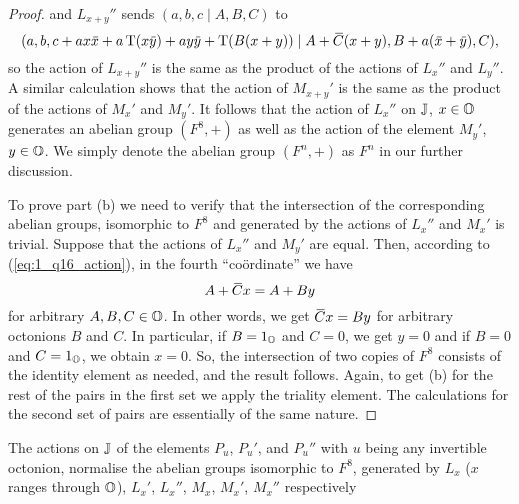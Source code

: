 \begin{proof}
    and $L_{x+y}''$ sends $(a,b,c\mid A,B,C)$ to
    \begin{equation*}
        (a,b,c+ax\ovx  + a\Tr(x\ovy ) + ay\ovy  + \Tr(B(x+y)) \mid
        A + \ovC (x+y), B+a(\ovx  + \ovy ), C),
    \end{equation*}
    so the action of $L_{x+y}''$ is the same as the product of the actions of $L_x''$ and
    $L_y''$. A similar calculation shows that the action of $M_{x+y}'$ is the same
    as the product of the actions of $M_x'$ and $M_y'$. It follows that the action of 
    $L_x''$ on $\mathbb{J}$, $x\in \mathbb{O}$ generates an abelian group $(F^8,+)$ as well as the action
    of the element $M_y'$, $y \in \mathbb{O}$. We simply denote the abelian group $(F^n,+)$ as $F^n$ in
    our further discussion. 
    
    To prove part (b) we need to verify that the intersection of the corresponding abelian groups, isomorphic to $F^8$ and generated by the actions of $L_x''$ and $M_x'$ is trivial. Suppose that the
    actions of $L_x''$ and $M_y'$ are equal. Then, according to (\ref{eq:1_q16_action}), 
    in the fourth ``co{\"o}rdinate'' we have
    \begin{equation*}
    	 A+\mathord{\mbox{\hspace*{0pt}}\,\overline{\!C\!\!\;}\!\:}\mbox{\hspace*{0pt}} x = A + B y
    \end{equation*}
    for arbitrary $A,B,C \in \mathbb{O}$. In other words, we get $\mathord{\mbox{\hspace*{0pt}}\,\overline{\!C\!\!\;}\!\:}\mbox{\hspace*{0pt}} x = B y$ for arbitrary octonions
    $B$ and $C$. In particular, if $B = 1_{\mathbb{O}}$ and $C = 0$, we get $y = 0$ and if
    $B = 0$ and $C = 1_{\mathbb{O}}$, we obtain $x = 0$. So, the intersection of two copies of
    $F^8$ consists of the identity element as needed, and the result follows. 
    Again, to get (b) for the rest of the pairs in the first set we apply the 
    triality element. The calculations for the second set of pairs are essentially
    of the same nature. 
\end{proof}

\begin{lemma}
	\label{lemma:1_pu_normalise_f8}
	The actions on $\mathbb{J}$ of the elements $P_u$, $P_u'$, and $P_u''$ with $u$ being any invertible octonion, 
	normalise the abelian groups isomorphic to $F^8$, 
	generated by $L_x$ ($x$ ranges through $\mathbb{O}$), 
	$L_x'$, $L_x''$, $M_x$, $M_x'$, $M_x''$ respectively
\end{lemma}

